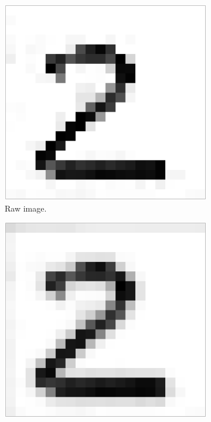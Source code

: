 \begin{figure}[H]
\centering
	\begin{subfigure}[b]{0.2\textwidth}
	\includegraphics[width=\textwidth]{graphics/smooth_none}
	\caption{Raw image.}
	\end{subfigure}
	\qquad
	\begin{subfigure}[b]{0.2\textwidth}
         \includegraphics[width=\textwidth]{graphics/smooth_05_5}

\end{subfigure}
\end{figure}
